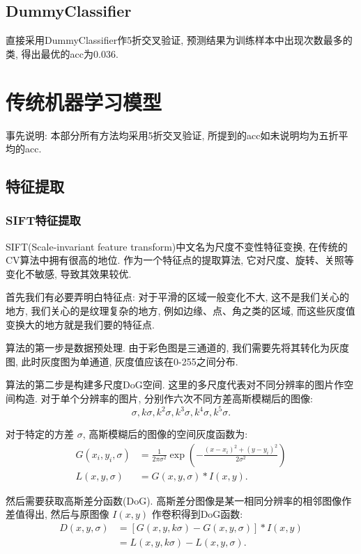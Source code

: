 \documentclass[lang=cn,12pt,a4paper]{elegantpaper}
\begin{document}
\subsection{DummyClassifier}
直接采用DummyClassifier作5折交叉验证, 预测结果为训练样本中出现次数最多的类, 得出最优的acc为0.036.
\section{传统机器学习模型}
事先说明: 本部分所有方法均采用5折交叉验证, 所提到的acc如未说明均为五折平均的acc.
\subsection{特征提取}
\subsubsection{SIFT特征提取}
SIFT(Scale-invariant feature transform)中文名为尺度不变性特征变换, 在传统的CV算法中拥有很高的地位. 作为一个特征点的提取算法, 它对尺度、旋转、关照等变化不敏感, 导致其效果较优.

首先我们有必要弄明白特征点: 对于平滑的区域一般变化不大, 这不是我们关心的地方, 我们关心的是纹理复杂的地方, 例如边缘、点、角之类的区域, 而这些灰度值变换大的地方就是我们要的特征点.

算法的第一步是数据预处理. 由于彩色图是三通道的, 我们需要先将其转化为灰度图, 此时灰度图为单通道, 灰度值应该在0-255之间分布.

算法的第二步是构建多尺度DoG空间. 这里的多尺度代表对不同分辨率的图片作空间构造. 对于单个分辨率的图片, 分别作六次不同方差高斯模糊后的图像:
\begin{equation*}
    \sigma, k\sigma, k^2\sigma, k^3\sigma, k^4\sigma, k^5\sigma.
\end{equation*}

对于特定的方差 $\sigma$, 高斯模糊后的图像的空间灰度函数为:
\begin{equation*}
\begin{aligned}
    G(x_i, y_i, \sigma) &= \frac{1}{2\pi \sigma^2}\exp{\left(-\frac{(x-x_i)^2+(y-y_i)^2}{2\sigma^2}\right)}\\
    L(x, y, \sigma) &= G(x, y, \sigma) * I(x, y).
\end{aligned}
\end{equation*}

然后需要获取高斯差分函数(DoG). 高斯差分图像是某一相同分辨率的相邻图像作差值得出, 然后与原图像 $I(x, y)$ 作卷积得到DoG函数:
\begin{equation*}
\begin{aligned}
    D(x, y, \sigma) &= \left[G(x, y, k\sigma)-G(x, y, \sigma)\right] * I(x, y)\\
    &=L(x, y, k\sigma) - L(x, y, \sigma).
\end{aligned}
\end{equation*}
\end{document}
